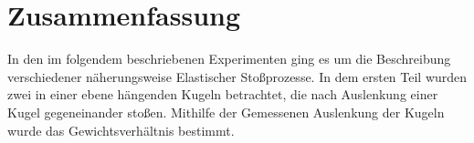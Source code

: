 
\section{Zusammenfassung}
In den im folgendem beschriebenen Experimenten ging es um die Beschreibung verschiedener näherungsweise Elastischer  Stoßprozesse.  In dem ersten Teil wurden zwei in einer ebene hängenden Kugeln betrachtet, die nach Auslenkung einer Kugel gegeneinander stoßen. Mithilfe der Gemessenen Auslenkung der Kugeln wurde das Gewichtsverhältnis bestimmt.
